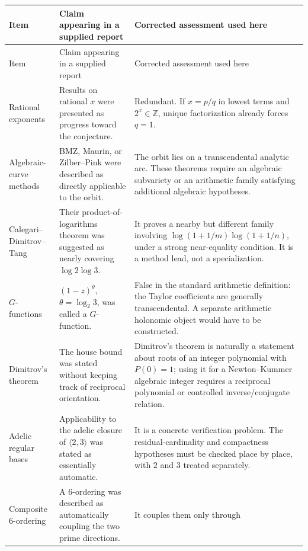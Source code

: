 \documentclass[10pt,letterpaper]{article}
\newcommand{\Z}{\mathbb Z}
\begin{document}
\begingroup
\footnotesize
\setlength{\LTleft}{0pt}
\setlength{\LTright}{0pt}
\begin{longtable}{@{}L{0.21\textwidth}L{0.34\textwidth}L{0.39\textwidth}@{}}
\toprule
Item & Claim appearing in a supplied report & Corrected assessment used here\\
\midrule
\endfirsthead
\toprule
Item & Claim appearing in a supplied report & Corrected assessment used here\\
\midrule
\endhead
\bottomrule
\endfoot
Rational exponents & Results on rational \(x\) were presented as progress toward the
conjecture. & Redundant.  If \(x=p/q\) in lowest terms and \(2^x\in\Z\), unique factorization
already forces \(q=1\).\\
\addlinespace
Algebraic-curve methods & BMZ, Maurin, or Zilber--Pink were described as directly applicable
to the orbit. & The orbit lies on a transcendental analytic arc.  These theorems require an
algebraic subvariety or an arithmetic family satisfying additional algebraic hypotheses.\\
\addlinespace
Calegari--Dimitrov--Tang & Their product-of-logarithms theorem was suggested as nearly covering
\(\log 2\log 3\). & It proves a nearby but different family involving
\(\log(1+1/m)\log(1+1/n)\), under a strong near-equality condition.  It is a method lead, not
a specialization.\\
\addlinespace
\(G\)-functions & \((1-z)^\theta\), \(\theta=\log_2 3\), was called a \(G\)-function. & False
in the standard arithmetic definition: the Taylor coefficients are generally
transcendental.  A separate arithmetic holonomic object would have to be constructed.\\
\addlinespace
Dimitrov's theorem & The house bound was stated without keeping track of reciprocal
orientation. & Dimitrov's theorem is naturally a statement about roots of an integer
polynomial with \(P(0)=1\); using it for a Newton--Kummer algebraic integer requires a
reciprocal polynomial or controlled inverse/conjugate relation.\\
\addlinespace
Adelic regular bases & Applicability to the adelic closure of \(\langle2,3\rangle\) was stated
as essentially automatic. & It is a concrete verification problem.  The residual-cardinality
and compactness hypotheses must be checked place by place, with \(2\) and \(3\) treated
separately.\\
\addlinespace
Composite \(6\)-ordering & A \(6\)-ordering was described as automatically coupling the two
prime directions. & It couples them only through

\end{longtable}
\end{document}
